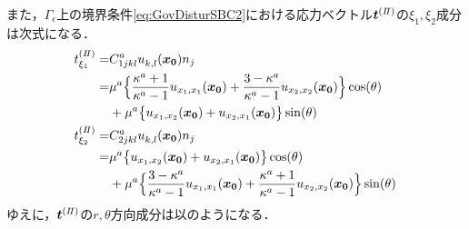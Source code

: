また，$\Gamma_\epsilon$上の境界条件\eqref{eq:GovDisturSBC2}における応力ベクトル$\bm{t}^{(I\hspace{-.15em}I)}$の$\xi_1,\xi_2$成分は次式になる．
\begin{align}
	t_{\xi_1}^{(I\hspace{-.15em}I)}=&C_{1jkl}^{a}u_{k,l}^{}(\bm{x_{0}})n_{j}
		\nonumber
		\\
		=&\mu^a\Bigl\{\frac{\kappa^a+1}{\kappa^a-1} u_{x_{1},x_{1}}(\bm{x_{0}})
		+\frac{3-\kappa^a}{\kappa^a-1} u_{x_{2},x_{2}}(\bm{x_{0}})\Bigr\}\cos(\theta)
		\nonumber
		\\
		&+\mu^a\bigl\{u_{x_{1},x_{2}}(\bm{x_{0}})+u_{x_{2},x_{1}}(\bm{x_{0}})\bigr\}\sin(\theta)
	\\
	t_{\xi_2}^{(I\hspace{-.15em}I)}=&C_{2jkl}^{a}u_{k,l}^{}(\bm{x_{0}})n_{j}
		\nonumber
		\\
		=&\mu^a \bigl\{u_{x_{1},x_{2}}(\bm{x_{0}})+u_{x_{2},x_{1}}(\bm{x_{0}})\bigr\}\cos(\theta)
		\nonumber
		\\
		&+\mu^a\Bigl\{ \frac{3-\kappa^a}{\kappa^a-1} u_{x_{1},x_{1}}(\bm{x_{0}})
		+\frac{\kappa^a+1}{\kappa^a-1} u_{x_{2},x_{2}}(\bm{x_{0}})\Bigr\}\sin(\theta)
\end{align}
ゆえに，$\bm{t}^{(I\hspace{-.15em}I)}$の$r,\theta$方向成分は以のようになる．
